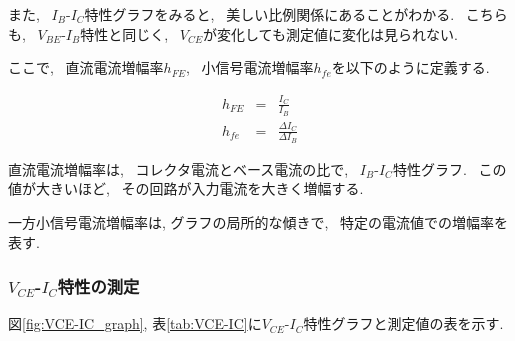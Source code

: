 \documentclass[uplatex,dvipdfmx,a4paper,js=standard, titlepage]{bxjsarticle}
\begin{document}
            また, ~$I_B$-$I_C$特性グラフをみると, ~美しい比例関係にあることがわかる.
            ~こちらも, ~$V_{BE}$-$I_B$特性と同じく, ~$V_{CE}$が変化しても測定値に変化は見られない.

            ここで, ~直流電流増幅率$h_{FE}$, ~小信号電流増幅率$h_{fe}$を以下のように定義する.

            \begin{eqnarray*}
                h_{FE} &=& \frac{I_C}{I_B} \\
                h_{fe} &=& \frac{\Delta I_C}{\Delta I_B}
            \end{eqnarray*}

            直流電流増幅率は, ~コレクタ電流とベース電流の比で, ~$I_B$-$I_C$特性グラフ.
            ~この値が大きいほど, ~その回路が入力電流を大きく増幅する.

            一方小信号電流増幅率は, グラフの局所的な傾きで, ~特定の電流値での増幅率を表す.

        \subsubsection{$V_{CE}$-$I_C$特性の測定}
            図\ref{fig:VCE-IC_graph}, 表\ref{tab:VCE-IC}に$V_{CE}$-$I_C$特性グラフと測定値の表を示す.
\end{document}
